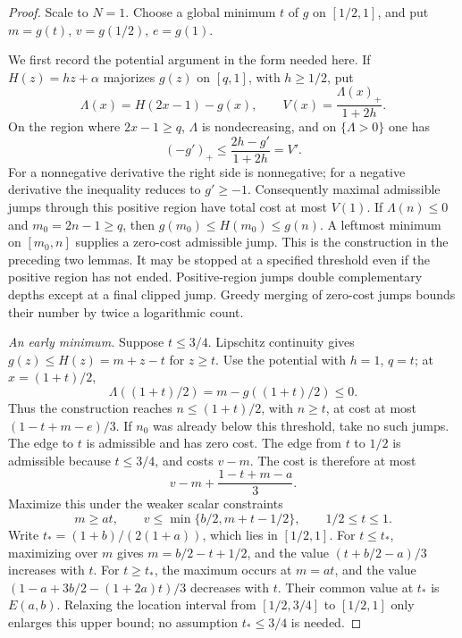 \begin{proof}
Scale to \(N=1\). Choose a global minimum \(t\) of \(g\) on \([1/2,1]\), and put
\(m=g(t)\), \(v=g(1/2)\), \(e=g(1)\).

We first record the potential argument in the form needed here. If
\(H(z)=hz+\alpha\) majorizes \(g(z)\) on \([q,1]\), with \(h\ge1/2\), put
$$
 \Lambda(x)=H(2x-1)-g(x),\qquad
 V(x)=\frac{\Lambda(x)_+}{1+2h}.
$$
On the region where \(2x-1\ge q\), \(\Lambda\) is nondecreasing, and on
\(\{\Lambda>0\}\) one has
$$
 (-g')_+\le\frac{2h-g'}{1+2h}=V'.
$$
For a nonnegative derivative the right side is nonnegative; for a negative derivative
the inequality reduces to \(g'\ge-1\). Consequently maximal admissible jumps
through this positive region have total cost at most \(V(1)\).
If \(\Lambda(n)\le0\) and \(m_0=2n-1\ge q\), then
\(g(m_0)\le H(m_0)\le g(n)\). A leftmost minimum on \([m_0,n]\) supplies a
zero-cost admissible jump. This is the construction in the preceding two lemmas.
It may be stopped at a specified threshold even if the positive region has not ended.
Positive-region jumps double complementary depths except at a final clipped jump.
Greedy merging of zero-cost jumps bounds their number by twice a logarithmic count.

\emph{An early minimum.} Suppose \(t\le3/4\). Lipschitz continuity gives
\(g(z)\le H(z)=m+z-t\) for \(z\ge t\). Use the potential with \(h=1\),
\(q=t\); at \(x=(1+t)/2\),
$$
 \Lambda((1+t)/2)=m-g((1+t)/2)\le0.
$$
Thus the construction reaches \(n\le(1+t)/2\), with \(n\ge t\), at cost at most
\((1-t+m-e)/3\). If \(n_0\) was already below this threshold, take no such jumps.
The edge to \(t\) is admissible and has zero cost. The edge from \(t\) to \(1/2\)
is admissible because \(t\le3/4\), and costs \(v-m\). The cost is therefore at most
$$
 v-m+\frac{1-t+m-a}{3}.
$$
Maximize this under the weaker scalar constraints
$$
 m\ge at,\qquad v\le\min\{b/2,m+t-1/2\},\qquad 1/2\le t\le1.
$$
Write \(t_*=(1+b)/(2(1+a))\), which lies in \([1/2,1]\).
For \(t\le t_*\), maximizing over \(m\) gives \(m=b/2-t+1/2\), and the value
\((t+b/2-a)/3\) increases with \(t\).
For \(t\ge t_*\), the maximum occurs at \(m=at\), and the value
\((1-a+3b/2-(1+2a)t)/3\) decreases with \(t\).
Their common value at \(t_*\) is \(E(a,b)\).
Relaxing the location interval from \([1/2,3/4]\) to \([1/2,1]\) only enlarges
this upper bound; no assumption \(t_*\le3/4\) is needed.


\end{proof}
